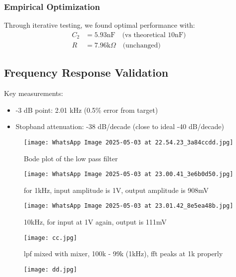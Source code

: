 \documentclass[conference]{IEEEtran}
\begin{document}
\subsubsection{Empirical Optimization}
Through iterative testing, we found optimal performance with:
\begin{align*}
C_2 &= 5.93\text{nF} \quad \text{(vs theoretical 10nF)} \\
R &= 7.96\text{k}\Omega \quad \text{(unchanged)}
\end{align*}

\subsection{Frequency Response Validation}

Key measurements:
\begin{itemize}
\item -3 dB point: 2.01 kHz (0.5\% error from target)
\item Stopband attenuation: -38 dB/decade (close to ideal -40 dB/decade)
\end{itemize}

\begin{figure}[H]
    \centering
    \texttt{[image: WhatsApp Image 2025-05-03 at 22.54.23\_3a84ccdd.jpg]}
    \caption{Bode plot of the low pass filter}
    \label{fig:enter-label}
\end{figure}
\begin{figure}[H]
    \centering
    \texttt{[image: WhatsApp Image 2025-05-03 at 23.00.41\_3e6b0d50.jpg]}
    \caption{for 1kHz, input amplitude is 1V, output amplitude is 908mV}
    \label{fig:enter-label}
\end{figure}
\begin{figure}[H]
    \centering
    \texttt{[image: WhatsApp Image 2025-05-03 at 23.01.42\_8e5ea48b.jpg]}
    \caption{10kHz, for input at 1V again, output is 111mV}
    \label{fig:enter-label}
\end{figure}
\begin{figure}[H]
    \centering
    \texttt{[image: cc.jpg]}
    \caption{lpf mixed with mixer, 100k - 99k (1kHz), fft peaks at 1k properly}
    \label{fig:enter-label}
\end{figure}
\begin{figure}[H]
    \centering
    \texttt{[image: dd.jpg]}
    \caption{}
    \label{fig:enter-label}
\end{figure}
\end{document}
